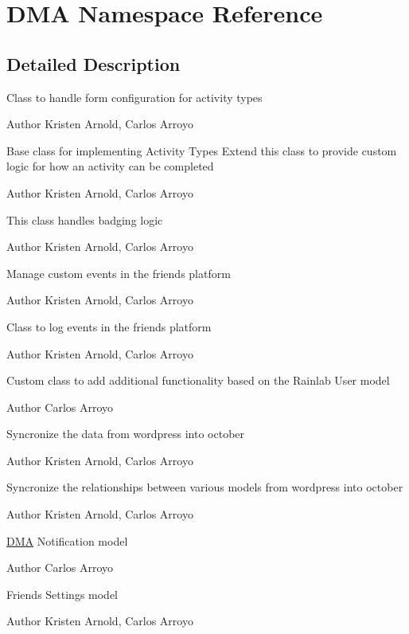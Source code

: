 \hypertarget{namespaceDMA}{\section{D\+M\+A Namespace Reference}
\label{namespaceDMA}
}


\subsection{Detailed Description}
Class to handle form configuration for activity types

\begin{DoxyAuthor}{Author}
Kristen Arnold, Carlos Arroyo
\end{DoxyAuthor}
Base class for implementing Activity Types Extend this class to provide custom logic for how an activity can be completed

\begin{DoxyAuthor}{Author}
Kristen Arnold, Carlos Arroyo
\end{DoxyAuthor}
This class handles badging logic

\begin{DoxyAuthor}{Author}
Kristen Arnold, Carlos Arroyo
\end{DoxyAuthor}
Manage custom events in the friends platform

\begin{DoxyAuthor}{Author}
Kristen Arnold, Carlos Arroyo
\end{DoxyAuthor}
Class to log events in the friends platform

\begin{DoxyAuthor}{Author}
Kristen Arnold, Carlos Arroyo
\end{DoxyAuthor}
Custom class to add additional functionality based on the Rainlab User model

\begin{DoxyAuthor}{Author}
Carlos Arroyo
\end{DoxyAuthor}
Syncronize the data from wordpress into october

\begin{DoxyAuthor}{Author}
Kristen Arnold, Carlos Arroyo
\end{DoxyAuthor}
Syncronize the relationships between various models from wordpress into october

\begin{DoxyAuthor}{Author}
Kristen Arnold, Carlos Arroyo
\end{DoxyAuthor}
\hyperlink{namespaceDMA}{D\+M\+A} Notification model  \begin{DoxyAuthor}{Author}
Carlos Arroyo
\end{DoxyAuthor}
Friends Settings model  \begin{DoxyAuthor}{Author}
Kristen Arnold, Carlos Arroyo 
\end{DoxyAuthor}
